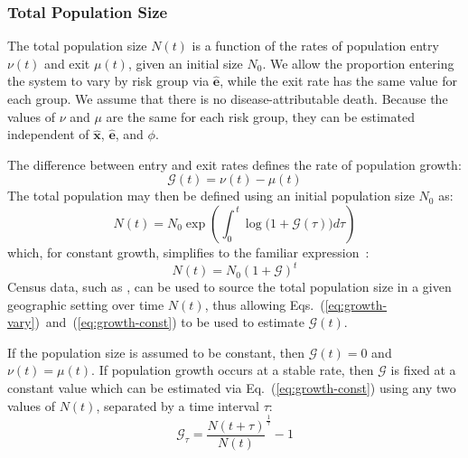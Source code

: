\subsubsection{Total Population Size}
\label{sss:params-nu-mu}
The total population size $N(t)$ is a function of
the rates of population entry $\nu(t)$ and exit $\mu(t)$, given an initial size $N_0$.
We allow the proportion entering the system to vary by risk group via $\bm{\hat{e}}$,
while the exit rate has the same value for each group.
We assume that there is no disease-attributable death.
Because the values of $\nu$ and $\mu$ are the same for each risk group, 
they can be estimated independent of
$\bm{\hat{x}}$, $\bm{\hat{e}}$, and $\phi$.
\par
The difference between entry and exit rates
defines the rate of population growth:
\begin{equation}\label{eq:growth-G}
\mathcal{G}(t) = \nu(t) - \mu(t) 
\end{equation}
The total population may then be defined using an initial population size $N_0$ as:
\begin{equation}\label{eq:growth-vary}
  N(t) = N_0 \exp{\left(\int_{0}^{\,t}{\log\big(1+\mathcal{G}(\tau) \big)d\tau}\right)}
\end{equation}
which, for constant growth, simplifies to the familiar expression~\citep{Malthus1798}:
\begin{equation}\label{eq:growth-const}
  N(t) = N_0 {(1 + \mathcal{G})}^{t}
\end{equation}
Census data, such as \citep{WorldBank}, can be used to source
the total population size in a given geographic setting over time $N(t)$,
thus allowing Eqs.~(\ref{eq:growth-vary})~and~(\ref{eq:growth-const})
to be used to estimate $\mathcal{G}(t)$.
\par
If the population size is assumed to be constant,
then $\mathcal{G}(t) = 0$ and $\nu(t) = \mu(t)$.
If population growth occurs at a stable rate, then
$\mathcal{G}$ is fixed at a constant value
which can be estimated via Eq.~(\ref{eq:growth-const})
using any two values of $N(t)$, separated by a time interval $\tau$:
\begin{equation}\label{eq:growth-backwards}
\mathcal{G}_{\tau} = {\frac{N(t+\tau)}{N(t)}}^{\frac{1}{\tau}} -1
\end{equation}
